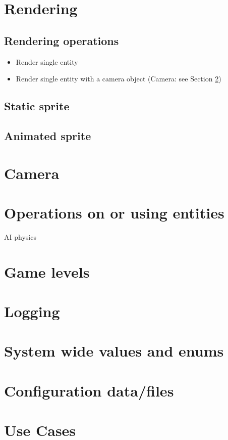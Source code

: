\documentclass[12pt]{article}
\begin{document}
\section{	Rendering}
\subsection{Rendering operations}
\begin{itemize}
	\item Render single entity
	\item Render single entity with a camera object (Camera: see Section \ref{sec:Camera})
\end{itemize}
\subsection{Static sprite}
\subsection{Animated sprite}


\section{ Camera} \label{sec:Camera}

\section{	Operations on or using entities}
		AI
		physics

\section{	Game levels}

\section{	Logging}

\section{	System wide values and enums}

\section{	Configuration data/files}

\section{Use Cases}
\end{document}
